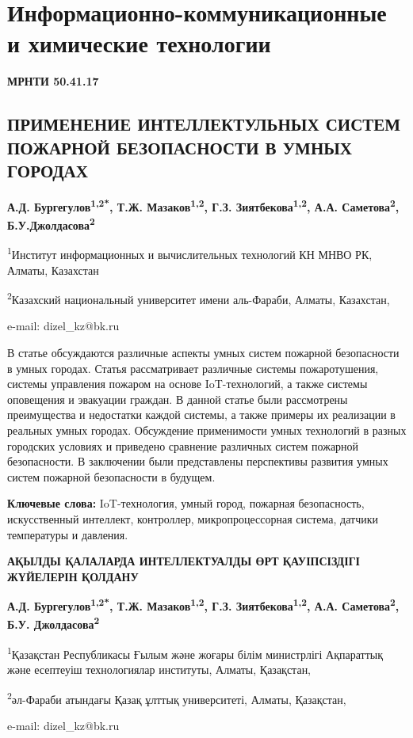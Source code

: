 \let\cleardoublepage\clearpage
\chapter{Информационно-коммуникационные и химические технологии}

{\bfseries МРНТИ 50.41.17}

\section{ПРИМЕНЕНИЕ ИНТЕЛЛЕКТУЛЬНЫХ СИСТЕМ ПОЖАРНОЙ БЕЗОПАСНОСТИ В УМНЫХ ГОРОДАХ}
\begin{center}
{\bfseries А.Д. Бургегулов\textsuperscript{1,2*}, Т.Ж.
Мазаков\textsuperscript{1,2}, Г.З. Зиятбекова\textsuperscript{1,2}, А.А.
Саметова\textsuperscript{2}, Б.У.Джолдасова\textsuperscript{2}}

\textsuperscript{1}Институт информационных и вычислительных технологий
КН МНВО РК, Алматы, Казахстан

\textsuperscript{2}Казахский национальный университет имени аль-Фараби,
Алматы, Казахстан,

e-mail: dizel\_kz@bk.ru
\end{center}

В статье обсуждаются различные аспекты умных систем пожарной
безопасности в умных городах. Статья рассматривает различные системы
пожаротушения, системы управления пожаром на основе IoT-технологий, а
также системы оповещения и эвакуации граждан. В данной статье были
рассмотрены преимущества и недостатки каждой системы, а также примеры их
реализации в реальных умных городах. Обсуждение применимости умных
технологий в разных городских условиях и приведено сравнение различных
систем пожарной безопасности. В заключении были представлены перспективы
развития умных систем пожарной безопасности в будущем.

{\bfseries Ключевые слова:} IoT-технология, умный город, пожарная
безопасность, искусственный интеллект, контроллер, микропроцессорная
система, датчики температуры и давления.

\begin{center}
{\large\bfseries АҚЫЛДЫ ҚАЛАЛАРДА ИНТЕЛЛЕКТУАЛДЫ ӨРТ ҚАУІПСІЗДІГІ ЖҮЙЕЛЕРІН
ҚОЛДАНУ}

{\bfseries А.Д. Бургегулов\textsuperscript{1,2*}, Т.Ж.
Мазаков\textsuperscript{1,2}, Г.З. Зиятбекова\textsuperscript{1,2}, А.А.
Саметова\textsuperscript{2}, Б.У. Джолдасова\textsuperscript{2}}

\textsuperscript{1}Қазақстан Республикасы Ғылым және жоғары білім
министрлігі Ақпараттық және есептеуіш технологиялар институты, Алматы,
Қазақстан,

\textsuperscript{2}әл-Фараби атындағы Қазақ ұлттық университеті, Алматы,
Қазақстан,

e-mail: dizel\_kz@bk.ru
\end{center}

